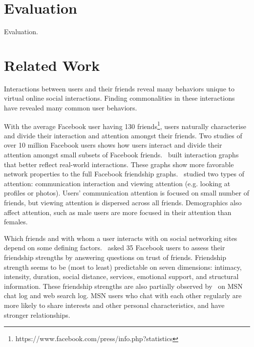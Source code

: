 \documentclass[letterpaper]{article}
\begin{document}
\section{Evaluation}


Evaluation.


\newpage


\mbox{}


\newpage


\mbox{}


\newpage


\section{Related Work}


Interactions between users and their friends reveal many behaviors unique to virtual online social interactions. Finding commonalities in these interactions have revealed many common user behaviors.


With the average Facebook user having 130 friends\footnote{https://www.facebook.com/press/info.php?statistics}, users naturally characterise and divide their interaction and attention amongst their friends. Two studies of over 10 million Facebook users shows how users interact and divide their attention amongst small subsets of Facebook friends.~\cite{wilson2009user} built interaction graphs that better reflect real-world interactions. These graphs show more favorable network properties to the full Facebook friendship graphs.~\cite{backstrom2011center} studied two types of attention: communication interaction and viewing attention (e.g. looking at profiles or photos). Users' communication attention is focused on small number of friends, but viewing attention is dispersed across all friends. Demographics also affect attention, such as male users are more focused in their attention than females.


Which friends and with whom a user interacts with on social networking sites depend on some defining factors.~\cite{gilbert2009predicting} asked 35 Facebook users to assess their friendship strengths by answering questions on trust of friends. Friendship strength seems to be (most to least) predictable on seven dimensions: intimacy, intensity, duration, social distance, services, emotional support, and structural information. These friendship strengths are also partially observed by~\cite{singla2008yes} on MSN chat log and web search log. MSN users who chat with each other regularly are more likely to share interests and other personal characteristics, and have stronger relationships.
\end{document}
